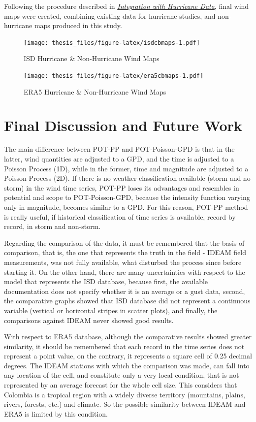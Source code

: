 \documentclass[12pt,oneside]{reedthesis}
\begin{document}
Following the procedure described in \emph{\protect\hyperlink{integration}{Integration with Hurricane Data}}, final wind maps were created, combining existing data for hurricane studies, and non-hurricane maps produced in this study.
\begin{figure}
\centering
\texttt{[image: thesis\_files/figure-latex/isdcbmaps-1.pdf]}
\caption{\label{fig:isdcbmaps}ISD Hurricane \& Non-Hurricane Wind Maps}
\end{figure}
\begin{figure}
\centering
\texttt{[image: thesis\_files/figure-latex/era5cbmaps-1.pdf]}
\caption{\label{fig:era5cbmaps}ERA5 Hurricane \& Non-Hurricane Wind Maps}
\end{figure}
\hypertarget{fd}{%
\section{Final Discussion and Future Work}\label{fd}}

The main difference between POT-PP and POT-Poisson-GPD is that in the latter, wind quantities are adjusted to a GPD, and the time is adjusted to a Poisson Process (1D), while in the former, time and magnitude are adjusted to a Poisson Process (2D). If there is no weather classification available (storm and no storm) in the wind time series, POT-PP loses its advantages and resembles in potential and scope to POT-Poisson-GPD, because the intensity function varying only in magnitude, becomes similar to a GPD. For this reason, POT-PP method is really useful, if historical classification of time series is available, record by record, in storm and non-storm.

Regarding the comparison of the data, it must be remembered that the basis of comparison, that is, the one that represents the truth in the field - IDEAM field measurements, was not fully available, what disturbed the process since before starting it. On the other hand, there are many uncertainties with respect to the model that represents the ISD database, because first, the available documentation does not specify whether it is an average or a gust data, second, the comparative graphs showed that ISD database did not represent a continuous variable (vertical or horizontal stripes in scatter plots), and finally, the comparisons against IDEAM never showed good results.

With respect to ERA5 database, although the comparative results showed greater similarity, it should be remembered that each record in the time series does not represent a point value, on the contrary, it represents a square cell of 0.25 decimal degrees. The IDEAM stations with which the comparison was made, can fall into any location of the cell, and constitute only a very local condition, that is not represented by an average forecast for the whole cell size. This considers that Colombia is a tropical region with a widely diverse territory (mountains, plains, rivers, forests, etc.) and climate. So the possible similarity between IDEAM and ERA5 is limited by this condition.
\end{document}
